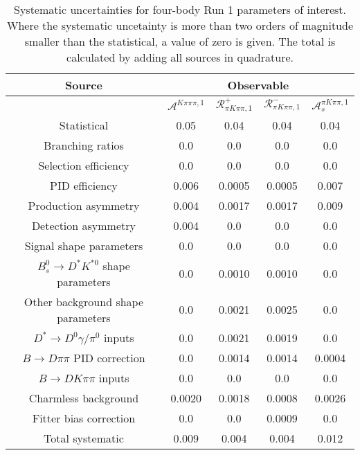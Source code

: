 \begin{sidewaystable}
  \centering
  \begin{tabular}{ccccc}
      \toprule
      Source & \multicolumn{4}{c}{Observable} \\
      \midrule
       & $\mathcal{A}^{K\pi\pi\pi,1}$ & $\mathcal{R}_{\pi K\pi\pi,1}^+$ & $\mathcal{R}_{\pi K\pi\pi,1}^-$ & $\mathcal{A}_s^{\pi K\pi\pi,1}$ \\
      \midrule
      Statistical & 0.05 & 0.04 & 0.04 & 0.04 \\
      \midrule
      Branching ratios & 0.0  & 0.0  & 0.0  & 0.0  \\
      Selection efficiency & 0.0  & 0.0  & 0.0  & 0.0  \\
      PID efficiency & 0.006 & 0.0005 & 0.0005 & 0.007 \\
      Production asymmetry & 0.004 & 0.0017 & 0.0017 & 0.009 \\
      Detection asymmetry & 0.004 & 0.0  & 0.0  & 0.0  \\
      Signal shape parameters & 0.0  & 0.0  & 0.0  & 0.0  \\
      $B^0_s \to D^* K^{*0}$ shape parameters & 0.0  & 0.0010 & 0.0010 & 0.0  \\
      Other background shape parameters & 0.0  & 0.0021 & 0.0025 & 0.0  \\
      $D^* \to D^0 \gamma/\pi^0$ inputs & 0.0  & 0.0021 & 0.0019 & 0.0  \\
      $B\to D\pi\pi$ PID correction & 0.0  & 0.0014 & 0.0014 & 0.0004 \\
      $B\to DK\pi\pi$ inputs & 0.0  & 0.0  & 0.0  & 0.0  \\
      Charmless background & 0.0020 & 0.0018 & 0.0008 & 0.0026 \\
      Fitter bias correction & 0.0  & 0.0  & 0.0009 & 0.0  \\
      \midrule
      Total systematic & 0.009 & 0.004 & 0.004 & 0.012 \\
      \bottomrule
  \end{tabular}
  \caption{Systematic uncertainties for four-body Run 1 parameters of interest. Where the systematic uncetainty is more than two orders of magnitude smaller than the statistical, a value of zero is given. The total is calculated by adding all sources in quadrature.}
\label{tab:fourBody_run1_systematics}
\end{sidewaystable}
